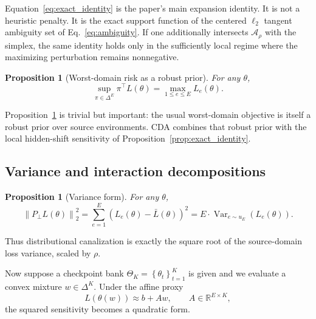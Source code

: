 \documentclass{article}
\newtheorem{proposition}[theorem]{Proposition}
\theoremstyle{definition}
\newcommand{\RR}{\mathbb{R}}
\newcommand{\cA}{\mathcal{A}}
\newcommand{\Var}{\operatorname{Var}}
\newcommand{\cda}{\textup{\textsc{CDA}}}
\newcommand{\simplex}{\Delta}
\newcommand{\norm}[1]{\left\lVert #1 \right\rVert}
\newcommand{\paren}[1]{\left( #1 \right)}
\newcommand{\braces}[1]{\left\{ #1 \right\}}
\newcommand{\ub}{u_E}
\begin{document}
Equation~\eqref{eq:exact_identity} is the paper's main expansion identity. It is not a heuristic penalty. It is the exact support function of the centered \(\ell_2\) tangent ambiguity set of Eq.~\eqref{eq:ambiguity}. If one additionally intersects \(\cA_\rho\) with the simplex, the same identity holds only in the sufficiently local regime where the maximizing perturbation remains nonnegative.

\begin{proposition}[Worst-domain risk as a robust prior]
\label{prop:worst_domain_prior}
For any \(\theta\),
\begin{equation}
\sup_{\pi \in \simplex^E} \pi^\top L(\theta)
=
\max_{1\le e\le E} L_e(\theta).
\label{eq:worst_domain_identity}
\end{equation}
\end{proposition}

Proposition~\ref{prop:worst_domain_prior} is trivial but important: the usual worst-domain objective is itself a robust prior over source environments. \cda{} combines that robust prior with the local hidden-shift sensitivity of Proposition~\ref{prop:exact_identity}.

\subsection{Variance and interaction decompositions}

\begin{proposition}[Variance form]
\label{prop:variance_form}
For any \(\theta\),
\begin{equation}
\norm{P_\perp L(\theta)}_2^2
=
\sum_{e=1}^{E}\paren{L_e(\theta)-\bar L(\theta)}^2
=
E \cdot \Var_{e\sim \ub}\!\paren{L_e(\theta)}.
\label{eq:variance_form}
\end{equation}
\end{proposition}

Thus distributional canalization is exactly the square root of the source-domain loss variance, scaled by \(\rho\).

Now suppose a checkpoint bank \(\Theta_K=\braces{\theta_t}_{t=1}^{K}\) is given and we evaluate a convex mixture \(w\in\simplex^K\). Under the affine proxy
\begin{equation}
L(\theta(w)) \approx b + A w,
\qquad
A\in\RR^{E\times K},
\label{eq:affine_proxy}
\end{equation}
the squared sensitivity becomes a quadratic form.
\end{document}

